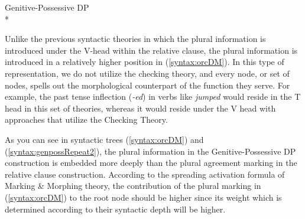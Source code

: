     \ex \label{syntax:genpossRepeat2} {Genitive-Possessive DP}\\*
    \z
    \z
    

Unlike the previous syntactic theories in which the plural information is introduced under the V-head within the relative clause, the plural information is introduced in a relatively higher position in (\ref{syntax:orcDM}). In this type of representation, we do not utilize the checking theory, and every node, or set of nodes, spells out the morphological counterpart of the function they serve.  For example, the past tense inflection (\emph{-ed}) in verbs like \emph{jumped} would reside in the T head in this set of theories, whereas it would reside under the V head with approaches that utilize the Checking Theory.

As you can see in syntactic trees (\ref{syntax:orcDM}) and (\ref{syntax:genpossRepeat2}), the plural information in the Genitive-Possessive DP construction is embedded more deeply than the plural agreement marking in the relative clause construction. According to the spreading activation formula of Marking \& Morphing theory, the contribution of the plural marking in (\ref{syntax:orcDM}) to the root node should be higher since its weight which is determined according to their syntactic depth will be higher. 

